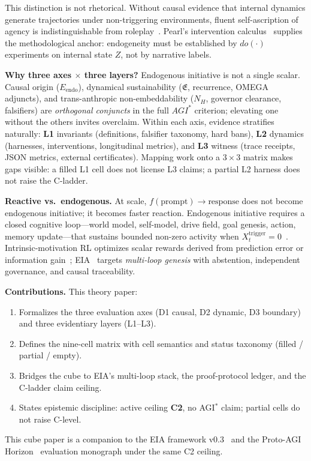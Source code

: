 \documentclass[11pt,a4paper]{article}
\theoremstyle{definition}
\begin{document}
This distinction is not rhetorical. Without causal evidence that internal dynamics generate trajectories under non-triggering environments, fluent self-ascription of agency is indistinguishable from roleplay~\cite{veitch2021counterfactual}. Pearl's intervention calculus~\cite{pearl2009causality} supplies the methodological anchor: endogeneity must be established by $do(\cdot)$ experiments on internal state $Z$, not by narrative labels.

\textbf{Why three axes $\times$ three layers?} Endogenous initiative is not a single scalar. Causal origin ($E_{\mathrm{endo}}$), dynamical sustainability ($\mathfrak{E}$, recurrence, OMEGA adjuncts), and trans-anthropic non-embeddability ($N_H$, governor clearance, falsifiers) are \emph{orthogonal conjuncts} in the full $AGI^{*}$ criterion; elevating one without the others invites overclaim. Within each axis, evidence stratifies naturally: \textbf{L1} invariants (definitions, falsifier taxonomy, hard bans), \textbf{L2} dynamics (harnesses, interventions, longitudinal metrics), and \textbf{L3} witness (trace receipts, JSON metrics, external certificates). Mapping work onto a $3\times 3$ matrix makes gaps visible: a filled L1 cell does not license L3 claims; a partial L2 harness does not raise the C-ladder.

\textbf{Reactive vs.\ endogenous.} At scale, $f(\text{prompt})\to\text{response}$ does not become endogenous initiative; it becomes faster reaction. Endogenous initiative requires a closed cognitive loop---world model, self-model, drive field, goal genesis, action, memory update---that sustains bounded non-zero activity when $X_t^{\mathrm{trigger}}=0$~\cite{kuznetsov2026stable,schmidhuber2010curiosity}. Intrinsic-motivation RL optimizes scalar rewards derived from prediction error or information gain~\cite{pathak2017curiosity}; EIA~\cite{kuznetsov2026eia} targets \emph{multi-loop genesis} with abstention, independent governance, and causal traceability.

\textbf{Contributions.} This theory paper:
\begin{enumerate}[leftmargin=*]
\item Formalizes the three evaluation axes (D1 causal, D2 dynamic, D3 boundary) and three evidentiary layers (L1--L3).
\item Defines the nine-cell matrix with cell semantics and status taxonomy (filled / partial / empty).
\item Bridges the cube to EIA's multi-loop stack, the proof-protocol ledger, and the C-ladder claim ceiling.
\item States epistemic discipline: active ceiling \textbf{C2}, no AGI$^{*}$ claim; partial cells do not raise C-level.
\end{enumerate}
This cube paper is a companion to the EIA framework v0.3~\cite{kuznetsov2026eiaframework} and the Proto-AGI Horizon~\cite{kuznetsov2026protohorizon} evaluation monograph under the same C2 ceiling.
\end{document}
